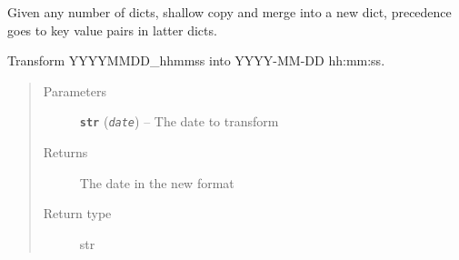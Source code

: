 \documentclass[a4paper,10pt,english]{sphinxmanual}
\begin{document}

\begin{fulllineitems}
\label{commands/apidoc/src:src.utilsSat.merge_dicts}
Given any number of dicts, shallow copy and merge into a new dict,
precedence goes to key value pairs in latter dicts.

\end{fulllineitems}


\begin{fulllineitems}
\label{commands/apidoc/src:src.utilsSat.normal}
\end{fulllineitems}


\begin{fulllineitems}
\label{commands/apidoc/src:src.utilsSat.only_numbers}
\end{fulllineitems}


\begin{fulllineitems}
\label{commands/apidoc/src:src.utilsSat.parse_date}
Transform YYYYMMDD\_hhmmss into YYYY-MM-DD hh:mm:ss.
\begin{quote}\begin{description}
\item[{Parameters}] \leavevmode
\textbf{\texttt{str}} (\emph{\texttt{date}}) -- The date to transform

\item[{Returns}] \leavevmode
The date in the new format

\item[{Return type}] \leavevmode
str

\end{description}\end{quote}

\end{fulllineitems}

\end{document}
